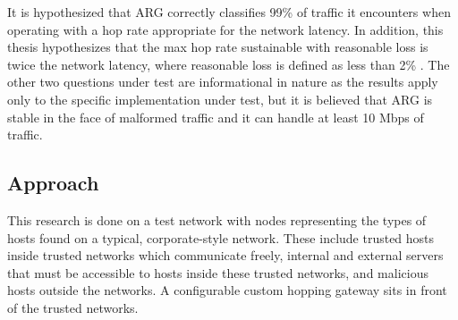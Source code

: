

\par It is hypothesized that \ac{ARG} correctly classifies 99\% of traffic it encounters when operating with a hop rate appropriate for the network latency. In addition, this thesis hypothesizes that the max hop rate sustainable with reasonable loss is twice the network latency, where reasonable loss is defined as less than 2\% . The other two questions under test are informational in nature as the results apply only to the specific implementation under test, but it is believed that \ac{ARG} is stable in the face of malformed traffic and it can handle at least 10 \ac{Mbps} of traffic. 

\subsection{Approach}
\label{sec:approach}
\par This research is done on a test network with nodes representing the types of hosts found on a typical, corporate-style network. These include trusted hosts inside trusted networks which communicate freely, internal and external servers that must be accessible to hosts inside these trusted networks, and malicious hosts outside the networks. A configurable custom hopping gateway sits in front of the trusted networks. 

